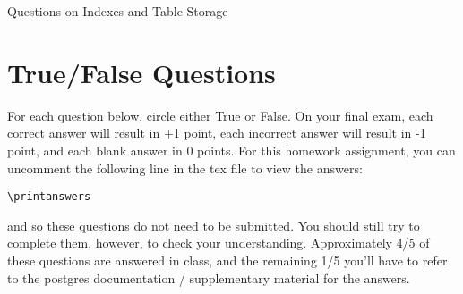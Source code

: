 \documentclass{exam}
\theoremstyle{definition}
\begin{document}
\begin{center}
\Huge
Questions on Indexes and Table Storage
\end{center}


\section{True/False Questions}

For each question below, circle either True or False.
On your final exam,
each correct answer will result in +1 point,
each incorrect answer will result in -1 point,
and each blank answer in 0 points.
For this homework assignment, you can uncomment the following line in the tex file to view the answers:
\begin{verbatim}
\printanswers
\end{verbatim}
and so these questions do not need to be submitted.
You should still try to complete them, however, to check your understanding.
Approximately 4/5 of these questions are answered in class,
and the remaining 1/5 you'll have to refer to the postgres documentation / supplementary material for the answers.
\end{document}
